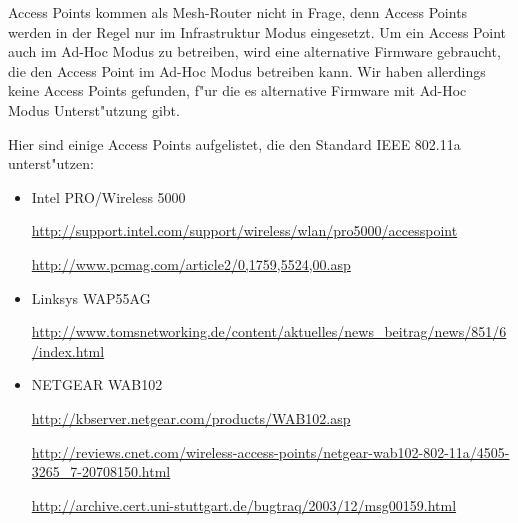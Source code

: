 Access Points kommen als Mesh-Router nicht in Frage, denn Access Points
werden in der Regel nur im Infrastruktur Modus eingesetzt. Um ein Access
Point auch im Ad-Hoc Modus zu betreiben, wird eine alternative Firmware
gebraucht, die den Access Point im Ad-Hoc Modus betreiben kann. Wir
haben allerdings keine Access Points gefunden, f"ur die es alternative
Firmware mit Ad-Hoc Modus Unterst"utzung gibt.

Hier sind einige Access Points aufgelistet, die den Standard IEEE 802.11a
unterst"utzen:

\begin{itemize}
\item Intel PRO/Wireless 5000 

\url{http://support.intel.com/support/wireless/wlan/pro5000/accesspoint}

\url{http://www.pcmag.com/article2/0,1759,5524,00.asp}

\item Linksys WAP55AG 

\url{http://www.tomsnetworking.de/content/aktuelles/news_beitrag/news/851/6/index.html}

\item NETGEAR WAB102 

\url{http://kbserver.netgear.com/products/WAB102.asp}

\url{http://reviews.cnet.com/wireless-access-points/netgear-wab102-802-11a/4505-3265\_7-20708150.html}

\url{http://archive.cert.uni-stuttgart.de/bugtraq/2003/12/msg00159.html}

\end{itemize}
